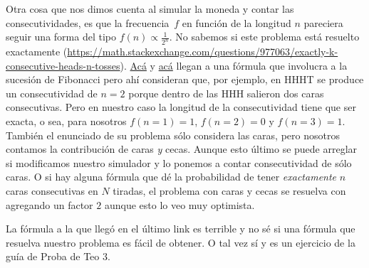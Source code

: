 \documentclass[a4paper]{article}
\begin{document}
Otra cosa que nos dimos cuenta al simular la moneda y contar las consecutividades, es que la frecuencia~$f$ en función de la longitud $n$ pareciera seguir una forma del tipo $f(n) \propto \frac{1}{2^n}$.
No sabemos si este problema está resuelto exactamente (\url{https://math.stackexchange.com/questions/977063/exactly-k-consecutive-heads-n-tosses}).
\href{https://math.stackexchange.com/questions/148353/given-n-raffles-what-is-the-chance-of-winning-k-in-a-row}{Acá} y \href{https://marknelson.us/posts/2011/01/17/20-heads-in-a-row-what-are-the-odds.html}{acá} llegan a una fórmula que involucra a la sucesión de Fibonacci pero ahí consideran que, por ejemplo, en HHHT se produce un consecutividad de $n=2$ porque dentro de las HHH salieron dos caras consecutivas.
Pero en nuestro caso la longitud de la consecutividad tiene que ser exacta, o sea, para nosotros $f(n=1)=1$, $f(n=2)=0$ y $f(n=3)=1$.
También el enunciado de su problema sólo considera las caras, pero nosotros contamos la contribución de caras \emph{y} cecas.
Aunque esto último se puede arreglar si modificamos nuestro simulador y lo ponemos a contar consecutividad de sólo caras.
O si hay alguna fórmula que dé la probabilidad de tener \emph{exactamente} $n$ caras consecutivas en $N$ tiradas, el problema con caras y cecas se resuelva con agregando un factor $2$ aunque esto lo veo muy optimista.

La fórmula a la que llegó en el último link es terrible y no sé si una fórmula que resuelva nuestro problema es fácil de obtener.
O tal vez sí y es un ejercicio de la guía de Proba de Teo 3.
\end{document}
